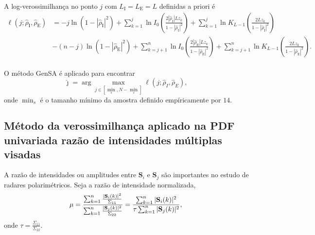 A log-verossimilhança no ponto $j$ com $L_\text{I}=L_\text{E}=L$ definidas a priori é
\begin{equation}\label{eq:TotalLogLikelihood_prod_mag}
\begin{split}
\ell(j;\widehat{\rho}_\text{I}, \widehat{\rho}_\text{E})&
=-j\ln(1-|\widehat{\rho}_\text{I}|^2)
 +\sum_{k=1}^{j}\ln I_0\left(\frac{2|\widehat{\rho}_\text{I}|Lz_k}{1-|\widehat{\rho}_\text{I}|^2}\right)
 + \sum_{k=1}^{j}\ln K_{L-1}\left(\frac{2Lz_k}{1-|\widehat{\rho}_\text{I}|^2}\right)\\
&-(n-j)\ln(1-|\widehat{\rho}_\text{E}|^2)
+\sum_{k=j+1}^{n}\ln I_0\left(\frac{2|\widehat{\rho}_\text{E}|Lz_k}{1-|\widehat{\rho}_\text{E}|^2}\right)
+ \sum_{k=j+1}^{n}\ln K_{L-1}\left(\frac{2Lz_k}{1-|\widehat{\rho}_\text{E}|^2}\right).\\
\end{split}
\end{equation}

O método GenSA é aplicado para encontrar
$$
\widehat{\jmath}= \arg\max\limits_{j\in [\min_s,N-\min_s]}\ell(j;\widehat{\rho}_I,\widehat{\rho}_E),
$$ 
onde $\min_s$ é o tamanho mínimo da amostra definido empíricamente por $14$.


\subsection{Método da verossimilhança aplicado na PDF univariada razão de intensidades múltiplas visadas}
A razão de intensidades ou amplitudes entre $\mathbf{S}_i$ e $\mathbf{S}_j$ são importantes no estudo de radares polarimétricos. Seja a razão de intensidade normalizada,
\begin{equation}\label{eq:razao_intensidades}
 \mu=\frac{\sum_{k=1}^{n}\frac{|\mathbf{S}_i(k)|^2}{\Sigma_{11}}}{\sum_{k=1}^{n}\frac{|\mathbf{S}_j(k)|^2}{\Sigma_{22}}}=\frac{\sum_{k=1}^{n}|\mathbf{S}_i(k)|^2}{\tau\sum_{k=1}^{n}|\mathbf{S}_j(k)|^2},\\
\end{equation}
onde $\tau=\frac{\Sigma_{11}}{\Sigma_{22}}$.
  
